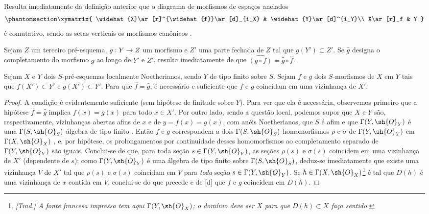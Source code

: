 \documentclass[oneside]{amsart}
\makeatletter
\newcommand{\ega@arrow}[2]{\mathchoice{#1}{#2}{#2}{#2}}
\renewcommand{\to}{\ega@arrow{\longrightarrow}{\rightarrow}}
\let\EGAOriginalLabel\label
\renewcommand{\label}[1]{\phantomsection\EGAOriginalLabel{#1}}
\makeatother
\begin{document}
\begin{env}[10.9.2]
\label{I.10.9.2}
Resulta imediatamente da definição anterior que o diagrama de morfismos de espaços anelados
\[
  \label{I.10.9.2.1}
  \xymatrix{
    \widehat{X}\ar[r]^{\widehat{f}}\ar[d]_{i_X} &
    \widehat{Y}\ar[d]^{i_Y}\\
    X\ar[r]_f &
    Y
  }
\]
é comutativo, sendo as setas verticais os morfismos canônicos .
\end{env}

\begin{env}[10.9.3]
\label{I.10.9.3}
Sejam $Z$ um terceiro pré-esquema, $g:Y\to Z$ um morfismo e $Z'$ uma parte fechada de $Z$ tal que $g(Y')\subset Z'$.
Se $\widehat{g}$ designa o completamento do morfismo $g$ ao longo de $Y'$ e $Z'$, resulta imediatamente de  que
$\widehat{(g\circ f)}=\widehat{g}\circ\widehat{f}$.
\end{env}

\begin{proposition}[10.9.4]
\label{I.10.9.4}
Sejam $X$ e $Y$ dois $S$-pré-esquemas localmente Noetherianos, sendo $Y$ de tipo finito sobre $S$.
Sejam $f$ e $g$ dois $S$-morfismos de $X$ em $Y$ tais que $f(X')\subset Y'$ e $g(X')\subset Y'$.
Para que $\widehat{f}=\widehat{g}$, é necessário e suficiente que $f$ e $g$ coincidam em uma vizinhança de $X'$.
\end{proposition}

\begin{proof}
A condição é evidentemente suficiente (sem hipótese de finitude sobre $Y$).
Para ver que ela é necessária, observemos primeiro que a hipótese $\widehat{f}=\widehat{g}$ implica $f(x)=g(x)$ para todo $x\in X'$.
Por outro lado, sendo a questão local, podemos supor que $X$ e $Y$ são, respectivamente, vizinhanças abertas afins de $x$ e de $y=f(x)=g(x)$, com anéis Noetherianos, que $S$ é afim e que $\Gamma(Y,\sh{O}_Y)$ é uma $\Gamma(S,\sh{O}_S)$-álgebra de tipo finito .
Então $f$ e $g$ correspondem a dois $\Gamma(S,\sh{O}_S)$-homomorfismos $\rho$ e $\sigma$ de $\Gamma(Y,\sh{O}_Y)$ em $\Gamma(X,\sh{O}_X)$ , e, por hipótese, os prolongamentos por continuidade desses homomorfismos ao completamento separado de $\Gamma(Y,\sh{O}_Y)$ são iguais.
Conclui-se de  que, para toda seção $s\in\Gamma(Y,\sh{O}_Y)$, as seções $\rho(s)$ e $\sigma(s)$ coincidem em uma vizinhança de $X'$ (dependente de $s$); como $\Gamma(Y,\sh{O}_Y)$ é uma álgebra de tipo finito sobre $\Gamma(S,\sh{O}_S)$, deduz-se imediatamente que existe uma vizinhança $V$ de $X'$ tal que $\rho(s)$ e $\sigma(s)$ coincidam em $V$ para \emph{toda} seção $s\in\Gamma(Y,\sh{O}_Y)$.
Se $h\in\Gamma(X,\sh{O}_X)$\footnote{\emph{[Trad.] A fonte francesa impressa tem aqui $\Gamma(Y,\sh{O}_X)$; o domínio deve ser $X$ para que $D(h)\subset X$ faça sentido.}} é tal que $D(h)$ é uma vizinhança de $x$ contida em $V$, conclui-se do que precede e de [d] que $f$ e $g$ coincidem em $D(h)$.
\end{proof}
\end{document}
